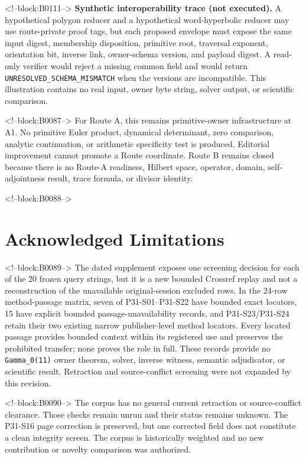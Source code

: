 \documentclass[11pt]{article}
\begin{document}
<!--block:B0111-->
\noindent\textbf{Synthetic interoperability trace (not executed).}
A hypothetical polygon reducer and a hypothetical word-hyperbolic reducer may
use route-private proof tags, but each proposed envelope must expose the same
input digest, membership disposition, primitive root, traversal exponent,
orientation bit, inverse link, owner-schema version, and payload digest. A
read-only verifier would reject a missing common field and would return
\texttt{UNRESOLVED\_SCHEMA\_MISMATCH} when the versions are incompatible.
This illustration contains no real input, owner byte string, solver output, or
scientific comparison.

<!--block:B0087-->
For Route A, this remains primitive-owner infrastructure at A1. No
primitive Euler product, dynamical determinant, zero comparison,
analytic continuation, or arithmetic specificity test is produced.
Editorial improvement cannot promote a Route coordinate. Route B remains
closed because there is no Route-A readiness, Hilbert space, operator,
domain, self-adjointness result, trace formula, or divisor identity.

<!--block:B0088-->
\hypertarget{8-acknowledged-limitations}{%
\section{Acknowledged
Limitations}\label{8-acknowledged-limitations}}

<!--block:B0089-->
The dated supplement exposes one screening decision for each of the 20 frozen
query strings, but it is a new bounded Crossref replay and not a reconstruction
of the unavailable original-session excluded rows. In the 24-row method-passage
matrix, seven of P31-S01--P31-S22 have bounded exact locators, 15 have explicit
bounded passage-unavailability records, and P31-S23/P31-S24 retain their two
existing narrow publisher-level method locators. Every located passage provides
bounded context within its registered use and preserves the prohibited transfer;
none proves the role in full. These records provide no
\texttt{Gamma\_0(11)} owner theorem, solver, inverse witness, semantic adjudicator,
or scientific result. Retraction and source-conflict screening were not expanded
by this revision.

<!--block:B0090-->
The corpus has no general current retraction or source-conflict
clearance. Those checks remain unrun and their status remains unknown.
The P31-S16 page correction is
preserved, but one corrected field does not constitute a clean integrity
screen. The corpus is historically weighted and no new contribution or
novelty comparison was authorized.
\end{document}
